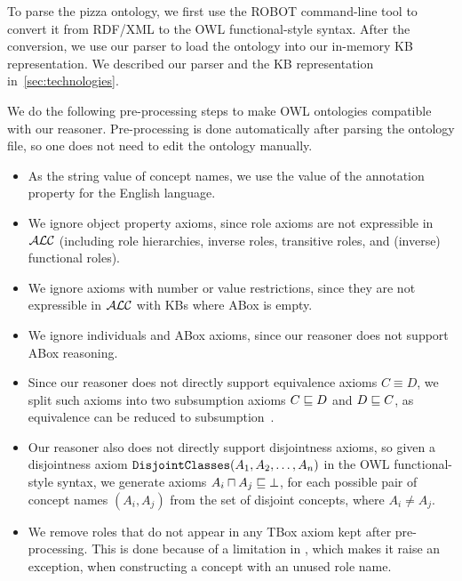 
To parse the pizza ontology, we first use the ROBOT command-line tool to convert it from RDF/XML to the OWL functional-style syntax.
After the conversion, we use our parser to load the ontology into our in-memory KB representation.
We described our parser and the KB representation in~\autoref{sec:technologies}.



We do the following pre-processing steps to make OWL ontologies compatible with our reasoner.
Pre-processing is done automatically after parsing the ontology file, so one does not need to edit the ontology manually.

\begin{itemize}
\item As the string value of concept names, we use the value of the  annotation property for the English language.
\item We ignore object property axioms, since role axioms are not expressible in $\mathcal{ALC}$ (including role hierarchies, inverse roles, transitive roles, and (inverse) functional roles).
\item We ignore axioms with number or value restrictions, since they are not expressible in $\mathcal{ALC}$ with KBs where ABox is empty.
\item We ignore individuals and ABox axioms, since our reasoner does not support ABox reasoning.
\item Since our reasoner does not directly support equivalence axioms $C \equiv D$, we split such axioms into two subsumption axioms $C \sqsubseteq D$ and $D \sqsubseteq C$, as equivalence can be reduced to subsumption~\cite{baader_basic_2003}.
\item Our reasoner also does not directly support disjointness axioms, so given a disjointness axiom $\texttt{DisjointClasses}(A_1, A_2, \ldots, A_n)$ in the OWL functional-style syntax, we generate axioms $A_i \sqcap A_j \sqsubseteq \bot$, for each possible pair of concept names $(A_i, A_j)$ from the set of disjoint concepts, where $A_i \neq A_j$.
\item We remove roles that do not appear in any TBox axiom kept after pre-processing. This is done because of a limitation in \factpp{}, which makes it raise an exception, when constructing a concept with an unused role name.
\end{itemize}

